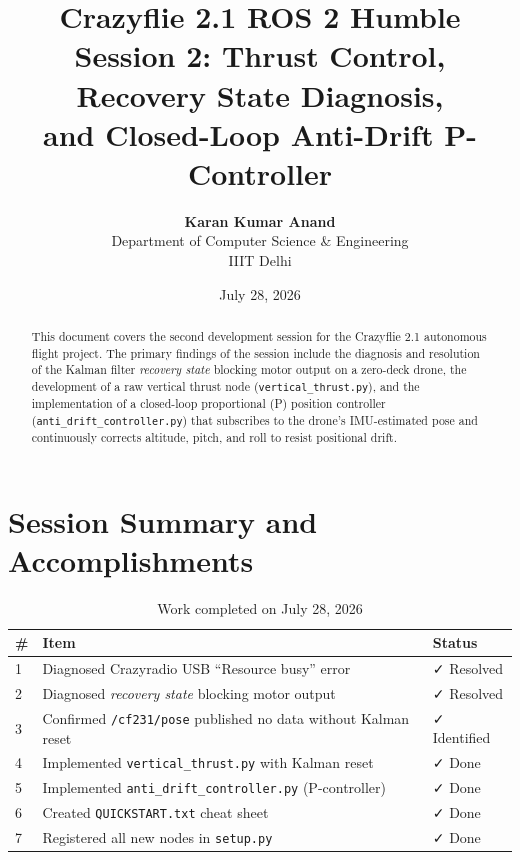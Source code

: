 \documentclass[11pt,a4paper]{article}
\title{\textbf{\Huge Crazyflie 2.1 ROS 2 Humble}\\[0.4em]
\Large Session 2: Thrust Control, Recovery State Diagnosis,\\
and Closed-Loop Anti-Drift P-Controller}
\author{\textbf{Karan Kumar Anand}\\
Department of Computer Science \& Engineering\\
IIIT Delhi}
\date{July 28, 2026}
\begin{document}
\maketitle

\begin{abstract}
This document covers the second development session for the Crazyflie 2.1 autonomous flight project. The primary findings of the session include the diagnosis and resolution of the Kalman filter \emph{recovery state} blocking motor output on a zero-deck drone, the development of a raw vertical thrust node (\texttt{vertical\_thrust.py}), and the implementation of a closed-loop proportional (P) position controller (\texttt{anti\_drift\_controller.py}) that subscribes to the drone's IMU-estimated pose and continuously corrects altitude, pitch, and roll to resist positional drift.
\end{abstract}

\tableofcontents
\newpage

\section{Session Summary and Accomplishments}

\begin{table}[h!]
\centering
\caption{Work completed on July 28, 2026}
\vspace{0.3em}
\begin{tabular}{@{}lll@{}}
\toprule
\textbf{\#} & \textbf{Item}                           & \textbf{Status} \\ \midrule
1           & Diagnosed Crazyradio USB ``Resource busy'' error  & ✓ Resolved \\
2           & Diagnosed \emph{recovery state} blocking motor output & ✓ Resolved \\
3           & Confirmed \texttt{/cf231/pose} published no data without Kalman reset & ✓ Identified \\
4           & Implemented \texttt{vertical\_thrust.py} with Kalman reset      & ✓ Done \\
5           & Implemented \texttt{anti\_drift\_controller.py} (P-controller)  & ✓ Done \\
6           & Created \texttt{QUICKSTART.txt} cheat sheet                     & ✓ Done \\
7           & Registered all new nodes in \texttt{setup.py}                  & ✓ Done \\
\bottomrule
\end{tabular}
\end{table}
\end{document}
